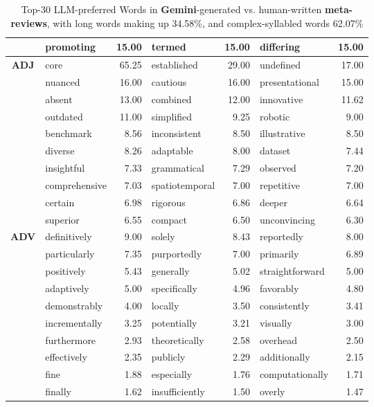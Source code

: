 \begin{table*}[t]
{\begin{tabular}{@{}c|lrlrlr@{}}
            & promoting & 15.00 & termed & 15.00 & differing & 15.00 \\
            \midrule
            \multirow{10}{*}{\textbf{ADJ}} 
            & core & 65.25 & established & 29.00 & undefined & 17.00 \\
            & nuanced & 16.00 & cautious & 16.00 & presentational & 15.00 \\
            & absent & 13.00 & combined & 12.00 & innovative & 11.62 \\
            & outdated & 11.00 & simplified & 9.25 & robotic & 9.00 \\
            & benchmark & 8.56 & inconsistent & 8.50 & illustrative & 8.50 \\
            & diverse & 8.26 & adaptable & 8.00 & dataset & 7.44 \\
            & insightful & 7.33 & grammatical & 7.29 & observed & 7.20 \\
            & comprehensive & 7.03 & spatiotemporal & 7.00 & repetitive & 7.00 \\
            & certain & 6.98 & rigorous & 6.86 & deeper & 6.64 \\
            & superior & 6.55 & compact & 6.50 & unconvincing & 6.30 \\
            \midrule
            \multirow{10}{*}{\textbf{ADV}} 
            & definitively & 9.00 & solely & 8.43 & reportedly & 8.00 \\
            & particularly & 7.35 & purportedly & 7.00 & primarily & 6.89 \\
            & positively & 5.43 & generally & 5.02 & straightforward & 5.00 \\
            & adaptively & 5.00 & specifically & 4.96 & favorably & 4.80 \\
            & demonstrably & 4.00 & locally & 3.50 & consistently & 3.41 \\
            & incrementally & 3.25 & potentially & 3.21 & visually & 3.00 \\
            & furthermore & 2.93 & theoretically & 2.58 & overhead & 2.50 \\
            & effectively & 2.35 & publicly & 2.29 & additionally & 2.15 \\
            & fine & 1.88 & especially & 1.76 & computationally & 1.71 \\
            & finally & 1.62 & insufficiently & 1.50 & overly & 1.47 \\
            \bottomrule
        \end{tabular}
    }
    \caption{Top-30 LLM-preferred Words in \textbf{Gemini}-generated vs. human-written \textbf{meta-reviews}, with long words making up 34.58\%, and complex-syllabled words 62.07\%}
    \label{tab:gm}
\end{table*}